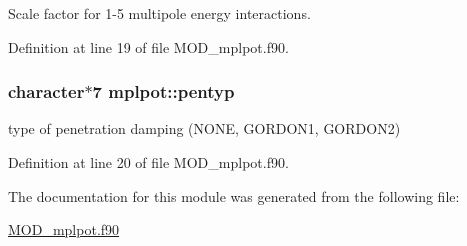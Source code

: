 Scale factor for 1-\/5 multipole energy interactions. 



Definition at line 19 of file M\-O\-D\-\_\-mplpot.\-f90.

\hypertarget{classmplpot_a708bce94d76aeb8f27fb117d8b2af74d}{
\subsubsection[{pentyp}]{\setlength{\rightskip}{0pt plus 5cm}character$\ast$7 mplpot\-::pentyp}}\label{classmplpot_a708bce94d76aeb8f27fb117d8b2af74d}


type of penetration damping (N\-O\-N\-E, G\-O\-R\-D\-O\-N1, G\-O\-R\-D\-O\-N2) 



Definition at line 20 of file M\-O\-D\-\_\-mplpot.\-f90.



The documentation for this module was generated from the following file\-:\begin{DoxyCompactItemize}
\item 
\hyperlink{MOD__mplpot_8f90}{M\-O\-D\-\_\-mplpot.\-f90}\end{DoxyCompactItemize}
